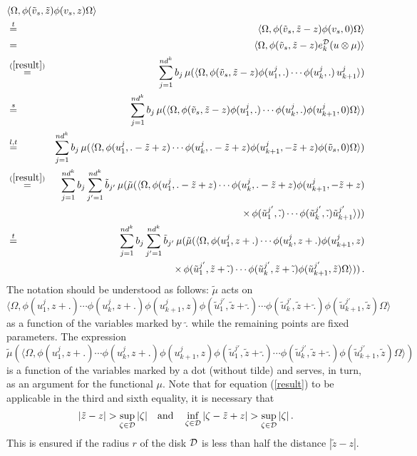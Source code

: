\documentclass[a4paper,12pt,twoside]{article}
\renewcommand{\b}{\langle}
\renewcommand{\k}{\rangle}
\renewcommand{\c}[1]{{\cal #1}}
\newcommand{\eq}[1]{(\ref{#1})}
\newcommand{\D}{\c{D}}
\newcommand{\ed}{e_k^{\D}}
\newcommand{\vt}{\tilde{v}}
\newcommand{\zt}{\tilde{z}}
\newcommand{\bt}{\tilde{b}}
\newcommand{\ut}{\tilde{u}}
\newcommand{\mut}{\tilde{\mu}}
\newcommand{\dt}{\tilde{.}}
\begin{document}
\begin{eqnarray}
\lefteqn{\b\Omega,\phi(\vt_s,\zt)\phi(v_s,z)\Omega\k} \nonumber \\
&\stackrel{t}{=}& \b\Omega,\phi(\vt_s,\zt-z)\phi(v_s,0)\Omega\k \nonumber \\
&=& \b\Omega,\phi(\vt_s,\zt-z)\ed(u\otimes\mu)\k \nonumber \\
&\stackrel{\eq{result}}{=}& \sum_{j=1}^{nd^k} b_j\,\mu(\b\Omega,\phi(\vt_s,\zt-z)
\phi(u^j_1,.)\cdots
\phi(u^j_k,.)\,u^j_{k+1}\k) \nonumber \\
&\stackrel{s}{=}& \sum_{j=1}^{nd^k} b_j\,\mu(\b\Omega,\phi(\vt_s,\zt-z)\phi(u^j_1,.)\cdots
\phi(u^j_k,.)\phi(u^j_{k+1},0)\Omega\k) \nonumber \\
&\stackrel{l,t}{=}& \sum_{j=1}^{nd^k} b_j\,\mu(\b\Omega,\phi(u^j_1,.-\zt+z)\cdots
\phi(u^j_k,.-\zt+z)\phi(u^j_{k+1},-\zt+z)\phi(\vt_s,0)\Omega\k) \nonumber \\
&\stackrel{\eq{result}}{=}& \sum_{j=1}^{nd^k} b_j\sum_{j'=1}^{nd^k} \bt_{j'}\,
\mu(\mut(\b\Omega,\phi(u^j_1,.-\zt+z)\cdots
\phi(u^j_k,.-\zt+z)\phi(u^j_{k+1},-\zt+z) \nonumber \\
& &
\hspace{2.7cm}\times\,\phi(\ut^{j'}_1,\dt)\cdots\phi(\ut^{j'}_k,\dt)\ut^{j'}_{k+1}\k))
\nonumber \\
&\stackrel{t}{=}& \sum_{j=1}^{nd^k} b_j\sum_{j'=1}^{nd^k} \bt_{j'}\,
\mu(\mut(\b\Omega,\phi(u^j_1,z+.)\cdots
\phi(u^j_k,z+.)\phi(u^j_{k+1},z) \nonumber \\
& &
\hspace{2.7cm}\times\,\phi(\ut^{j'}_1,\zt+\dt)\cdots\phi(\ut^{j'}_k,\zt+\dt)\phi(\ut^{j'}_{k+1},\zt)\Omega\k))\,.
 \label{expanded}
\end{eqnarray}
The notation should be understood as follows: $\mut$ acts on
$$
\b\Omega,\phi(u^j_1,z+.)\cdots
\phi(u^j_k,z+.)\phi(u^j_{k+1},z)\phi(\ut^{j'}_1,\zt+\dt)\cdots\phi(\ut^{j'}_k,\zt+\dt)\phi(\ut^{j'}_{k+1},\zt)\Omega\k
$$
as a function of the variables marked by $\dt$ while the remaining points
are fixed parameters.
The expression
$$\mut(\b\Omega,\phi(u^j_1,z+.)\cdots
\phi(u^j_k,z+.)\phi(u^j_{k+1},z)\phi(\ut^{j'}_1,\zt+\dt)\cdots\phi(\ut^{j'}_k,\zt+\dt)\phi(\ut^{j'}_{k+1},\zt)\Omega\k)$$
is a function of the variables marked by a dot (without tilde)
and serves, in turn, as an argument for the functional $\mu$.
Note that for equation \eq{result} to be applicable in the third
and sixth equality, it is necessary that
$$|\zt - z| > \sup_{\zeta\in\D} |\zeta|\quad\mbox{and}\quad \inf_{\zeta\in\D} |\zeta -\zt + z|
> \sup_{\zeta\in\D} |\zeta|\,.$$
This is ensured if the radius $r$ of the disk $\D$ is less than
half the distance $|\zt - z|$.
\end{document}
